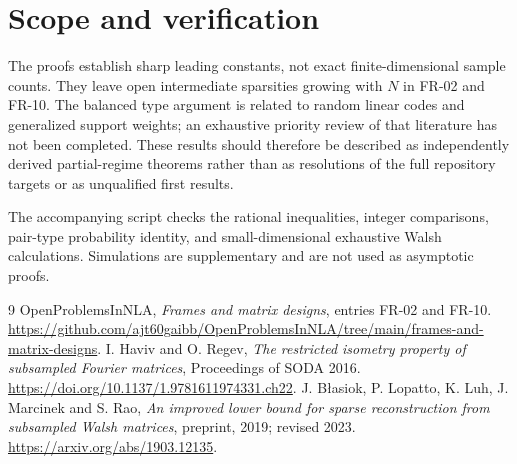 \documentclass[11pt]{article}
\theoremstyle{remark}\newtheorem{remark}[theorem]{Remark}
\begin{document}
\section{Scope and verification}
The proofs establish sharp leading constants, not exact finite-dimensional sample counts. They leave open intermediate sparsities growing with $N$ in FR-02 and FR-10. The balanced type argument is related to random linear codes and generalized support weights; an exhaustive priority review of that literature has not been completed. These results should therefore be described as independently derived partial-regime theorems rather than as resolutions of the full repository targets or as unqualified first results.

The accompanying script checks the rational inequalities, integer comparisons, pair-type probability identity, and small-dimensional exhaustive Walsh calculations. Simulations are supplementary and are not used as asymptotic proofs.

\begin{thebibliography}{9}
 OpenProblemsInNLA, \emph{Frames and matrix designs}, entries FR-02 and FR-10. \url{https://github.com/ajt60gaibb/OpenProblemsInNLA/tree/main/frames-and-matrix-designs}.
 I. Haviv and O. Regev, \emph{The restricted isometry property of subsampled Fourier matrices}, Proceedings of SODA 2016. \url{https://doi.org/10.1137/1.9781611974331.ch22}.
 J. B\l{}asiok, P. Lopatto, K. Luh, J. Marcinek and S. Rao, \emph{An improved lower bound for sparse reconstruction from subsampled Walsh matrices}, preprint, 2019; revised 2023. \url{https://arxiv.org/abs/1903.12135}.
\end{thebibliography}
\end{document}
